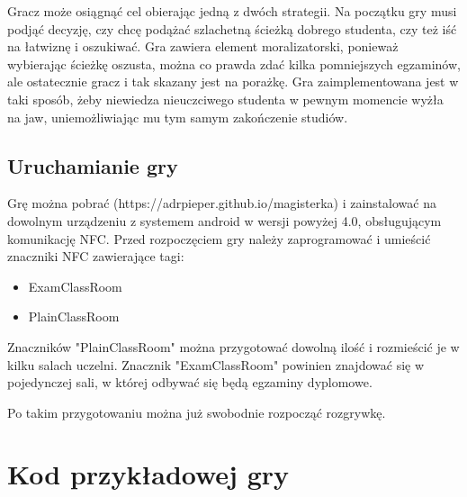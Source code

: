 \documentclass{xmgr}
\begin{document}
Gracz może osiągnąć cel obierając jedną z dwóch strategii. Na początku gry musi podjąć decyzję, czy chcę podążać szlachetną ścieżką dobrego studenta, czy też iść na łatwiznę i oszukiwać. Gra zawiera element moralizatorski, ponieważ wybierając ścieżkę oszusta, można co prawda zdać kilka pomniejszych egzaminów, ale ostatecznie gracz i tak skazany jest na porażkę. Gra zaimplementowana jest w taki sposób, żeby niewiedza nieuczciwego studenta w pewnym momencie wyżła na jaw, uniemożliwiając mu tym samym zakończenie studiów.

\section{Uruchamianie gry}

Grę można pobrać (https://adrpieper.github.io/magisterka) i zainstalować na dowolnym urządzeniu z systemem android w wersji powyżej 4.0, obsługującym komunikację NFC. Przed rozpoczęciem gry należy zaprogramować i umieścić znaczniki NFC zawierające tagi:
\begin{itemize}
	\item ExamClassRoom
	\item PlainClassRoom
\end{itemize}
Znaczników "PlainClassRoom" można przygotować dowolną ilość i rozmieścić je w kilku salach uczelni. Znacznik "ExamClassRoom" powinien znajdować się w pojedynczej sali, w której odbywać się będą egzaminy dyplomowe.

Po takim przygotowaniu można już swobodnie rozpocząć rozgrywkę.

\appendix
\chapter{Kod przykładowej gry}
\end{document}

